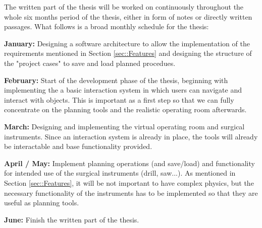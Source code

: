 The written part of the thesis will be worked on continuously throughout the whole six months period of the thesis, either in form of notes or directly written passages. What follows is a broad monthly schedule for the thesis:

\textbf{January:}
Designing a software architecture to allow the implementation of the requirements mentioned in Section \ref{sec::Features} and designing the structure of the "project cases" to save and load planned procedues.

\textbf{February:}
Start of the development phase of the thesis, beginning with implementing the a basic interaction system in which users can navigate and interact with objects.
This is important as a first step so that we can fully concentrate on the planning tools and the realistic operating room afterwards.

\textbf{March:}
Designing and implementing the virtual operating room and surgical instruments. Since an interaction system is already in place, the tools will already be interactable and base functionality provided.

\textbf{April / May:}
Implement planning operations (and save/load) and functionality for intended use of the surgical instruments (drill, saw...).
As mentioned in Section \ref{sec::Features}, it will be not important to have complex physics, but the necessary functionality of the instruments has to be implemented so that they are useful as planning tools.

\textbf{June:}
Finish the written part of the thesis.




